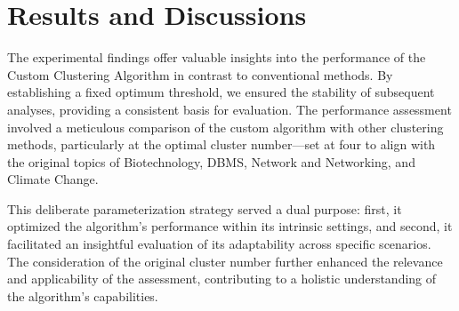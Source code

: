 \documentclass{article}
\begin{document}
\section{Results and Discussions}
The experimental findings offer valuable insights into the performance of the Custom Clustering Algorithm in contrast to conventional methods. By establishing a fixed optimum threshold, we ensured the stability of subsequent analyses, providing a consistent basis for evaluation. The performance assessment involved a meticulous comparison of the custom algorithm with other clustering methods, particularly at the optimal cluster number—set at four to align with the original topics of Biotechnology, DBMS, Network and Networking, and Climate Change.

This deliberate parameterization strategy served a dual purpose: first, it optimized the algorithm's performance within its intrinsic settings, and second, it facilitated an insightful evaluation of its adaptability across specific scenarios. The consideration of the original cluster number further enhanced the relevance and applicability of the assessment, contributing to a holistic understanding of the algorithm's capabilities.
\end{document}
